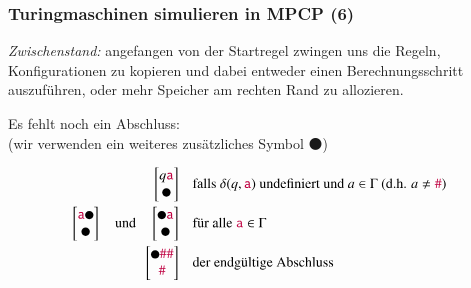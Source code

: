 \documentclass[onlymath]{beamer}
\begin{document}
\begin{frame}\frametitle{Turingmaschinen simulieren in MPCP (6)}

\emph{Zwischenstand:} angefangen von der Startregel zwingen uns die Regeln, Konfigurationen
zu kopieren und dabei entweder einen Berechnungsschritt auszuführen, oder mehr Speicher am
rechten Rand zu allozieren.
\bigskip\pause

Es fehlt noch ein \alert{Abschluss:}\\
{(wir verwenden ein weiteres zusätzliches Symbol $\medbullet$)}

\begin{align*}
\left[\begin{matrix}q\Sterm{a}\\\medbullet\end{matrix}\right]\quad
	& \text{falls $\delta(q,\Sterm{a})$ undefiniert und $a\in\Gamma$ (d.h. $a\neq\Sterm{\#}$)}\\
\left[\begin{matrix}\Sterm{a}\medbullet\\\medbullet\end{matrix}\right]\quad\text{und}\quad\left[\begin{matrix}\medbullet\Sterm{a}\\\medbullet\end{matrix}\right]\quad
	& \text{für alle $\Sterm{a}\in\Gamma$}\\
\left[\begin{matrix}\medbullet\Sterm{\#}\Sterm{\#}\\\Sterm{\#}\end{matrix}\right]\quad
	& \text{der endgültige Abschluss}
\end{align*}

\end{frame}
\end{document}
